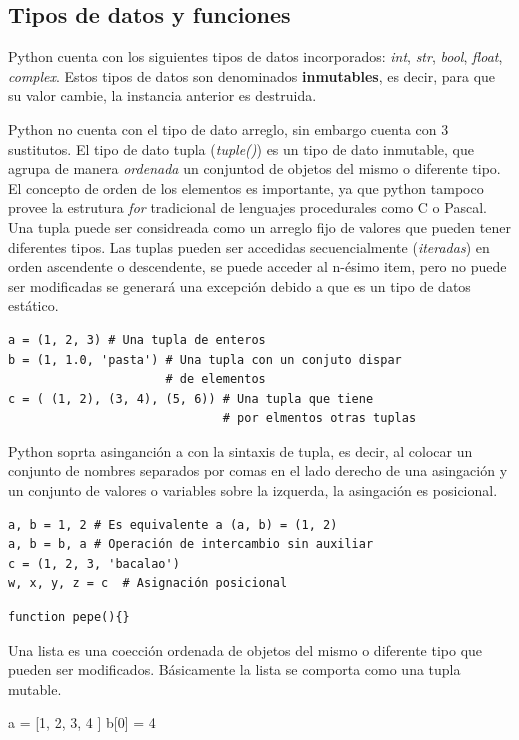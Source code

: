 \documentclass[a4paper]{report}
\begin{document}
\subsection{Tipos de datos y funciones}
Python cuenta con los siguientes tipos de datos incorporados: 
\emph{int}, 
\emph{str}, 
\emph{bool}, 
\emph{float}, 
\emph{complex}. Estos
tipos de datos son denominados \textbf{inmutables}, es decir, para que su valor cambie, la instancia anterior
es destruida. 

Python no cuenta con el tipo de dato arreglo, sin embargo cuenta con 3 sustitutos. 
El tipo de dato tupla (\emph{tuple()}) es un tipo de dato inmutable, que agrupa 
de manera \emph{ordenada} un conjuntod de objetos del mismo o diferente
tipo. El concepto de orden de los elementos es importante, ya que python tampoco provee la estrutura \emph{for} tradicional
de lenguajes procedurales como C o Pascal. %
Una tupla puede ser considreada como un arreglo fijo de valores que pueden
tener diferentes tipos. Las tuplas pueden ser accedidas secuencialmente (\emph{iteradas}) en orden ascendente o descendente, se puede 
acceder al n-ésimo item, pero no puede ser modificadas se generará una excepción debido 
a que es un tipo de datos estático.
\begin{lstlisting}[style=python]
a = (1, 2, 3) # Una tupla de enteros
b = (1, 1.0, 'pasta') # Una tupla con un conjuto dispar 
                      # de elementos
c = ( (1, 2), (3, 4), (5, 6)) # Una tupla que tiene 
                              # por elmentos otras tuplas
\end{lstlisting}

Python soprta asinganción a con la sintaxis de tupla, es decir, al colocar un conjunto de nombres 
separados por comas en el lado derecho de una asingación y un conjunto de valores o variables
sobre la izquerda, la asingación es posicional.
\begin{lstlisting}[style=python,label=asignacion-python,caption=Asignacion en Python]
a, b = 1, 2	# Es equivalente a (a, b) = (1, 2)
a, b = b, a	# Operación de intercambio sin auxiliar
c = (1, 2, 3, 'bacalao')
w, x, y, z = c	# Asignación posicional
\end{lstlisting}


\begin{lstlisting}[style=javascript,label=asignacion-python,caption=Asignacion en Python]
function pepe(){}
\end{lstlisting}

Una lista es una coección ordenada de objetos del mismo o diferente tipo que pueden 
ser modificados. Básicamente la lista se comporta como una tupla mutable.
\begin{python}
 a = [1, 2, 3, 4 ]
 b[0] = 4
\end{python}
\end{document}
